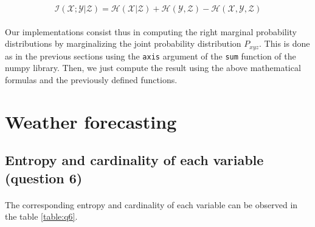 \documentclass[a4paper, 11pt, oneside]{article}
\begin{document}
$$ \mathcal{I}(\mathcal{X}; \mathcal{Y} | \mathcal{Z}) = \mathcal{H}(\mathcal{X} | \mathcal{Z}) + \mathcal{H}(\mathcal{Y}, \mathcal{Z}) - \mathcal{H}(\mathcal{X}, \mathcal{Y}, \mathcal{Z})$$

\paragraph{}Our implementations consist thus in computing the right marginal probability distributions by marginalizing the joint probability distribution $P_{xyz}$. This is done as in the previous sections using the \texttt{axis} argument of the \texttt{sum} function of the numpy library. Then, we just compute the result using the above mathematical formulas and the previously defined functions.

\section{Weather forecasting}

\subsection{Entropy and cardinality of each variable (question 6)}

\paragraph{}The corresponding entropy and cardinality of each variable can be observed in the table \ref{table:q6}.
\end{document}

